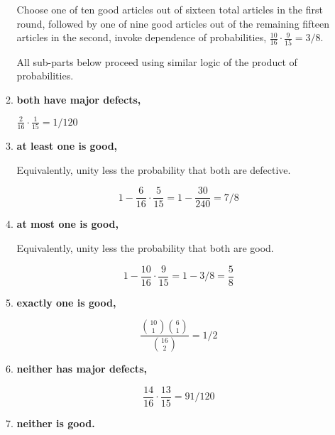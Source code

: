 \documentclass[10pt, oneside]{article}   	%
\theoremstyle{definition}
\begin{document}
\begin{enumerate}[label=2.\arabic*]
\begin{enumerate}
  Choose one of ten good articles out of sixteen total articles in the first round, followed by one of nine good articles out of the remaining fifteen articles in the second, invoke dependence of probabilities, $\frac{10}{16} \cdot \frac{9}{15} = \boxed{3/8}$.
  
  All sub-parts below proceed using similar logic of the product of probabilities.
  	
  	\item \begin{tcolorbox}[
  colback=Cerulean!5!white,
  colframe=Cerulean!75!black]
  \textbf{both have major defects,}
  \end{tcolorbox}
  
  	$\frac{2}{16} \cdot \frac{1}{15} = \boxed{1/120}$
  	\item \begin{tcolorbox}[
  colback=Cerulean!5!white,
  colframe=Cerulean!75!black]
  \textbf{at least one is good,}
  \end{tcolorbox}
  
  	Equivalently, unity less the probability that both are defective.
	
	\[ 1 - \frac{6}{16} \cdot \frac{5}{15} = 1 - \frac{30}{240} = \boxed{7/8} \]
  	\item \begin{tcolorbox}[
  colback=Cerulean!5!white,
  colframe=Cerulean!75!black]
  \textbf{at most one is good,}
  \end{tcolorbox}
  
  	Equivalently, unity less the probability that both are good. 
	
	\[ 1 - \frac{10}{16} \cdot \frac{9}{15} = 1 - 3/8 = \boxed{ \frac{5}{8} } \]
  	\item \begin{tcolorbox}[
  colback=Cerulean!5!white,
  colframe=Cerulean!75!black]
  \textbf{exactly one is good,}
  \end{tcolorbox}
  
  \[ \frac{\binom{10}{1} \binom{6}{1} }{\binom{16}{2}} = \boxed{1/2} \]
  	\item \begin{tcolorbox}[
  colback=Cerulean!5!white,
  colframe=Cerulean!75!black]
  \textbf{neither has major defects,}
  \end{tcolorbox}
  
  \[ \frac{14}{16} \cdot \frac{13}{15} = \boxed{91/120} \]
  	\item \begin{tcolorbox}[
  colback=Cerulean!5!white,
  colframe=Cerulean!75!black]
  \textbf{neither is good.}
  \end{tcolorbox}
  

\end{enumerate}
\end{enumerate}
\end{document}
